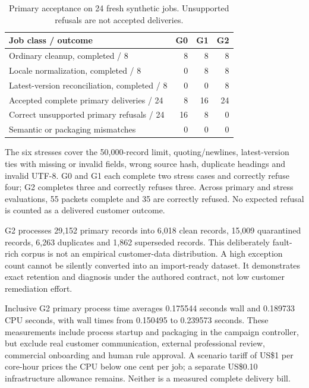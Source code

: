 \documentclass[11pt,letterpaper]{article}
\newcommand{\usd}[1]{US\$#1}
\begin{document}
\begin{table}[htbp]
\caption{Primary acceptance on 24 fresh synthetic jobs. Unsupported refusals are not accepted deliveries.}
\begin{tabularx}{\linewidth}{@{}Yrrr@{}}
\toprule
Job class / outcome & G0 & G1 & G2 \\
\midrule
Ordinary cleanup, completed / 8 & 8 & 8 & 8 \\
Locale normalization, completed / 8 & 0 & 8 & 8 \\
Latest-version reconciliation, completed / 8 & 0 & 0 & 8 \\
\midrule
Accepted complete primary deliveries / 24 & 8 & 16 & 24 \\
Correct unsupported primary refusals / 24 & 16 & 8 & 0 \\
Semantic or packaging mismatches & 0 & 0 & 0 \\
\bottomrule
\end{tabularx}
\label{tab:production}
\end{table}
The six stresses cover the 50,000-record limit, quoting/newlines, latest-version ties with missing or invalid fields, wrong source hash, duplicate headings and invalid UTF-8. G0 and G1 each complete two stress cases and correctly refuse four; G2 completes three and correctly refuses three. Across primary and stress evaluations, 55 packets complete and 35 are correctly refused. No expected refusal is counted as a delivered customer outcome.

G2 processes 29,152 primary records into 6,018 clean records, 15,009 quarantined records, 6,263 duplicates and 1,862 superseded records. This deliberately fault-rich corpus is not an empirical customer-data distribution. A high exception count cannot be silently converted into an import-ready dataset. It demonstrates exact retention and diagnosis under the authored contract, not low customer remediation effort.

Inclusive G2 primary process time averages 0.175544 seconds wall and 0.189733 CPU seconds, with wall times from 0.150495 to 0.239573 seconds. These measurements include process startup and packaging in the campaign controller, but exclude real customer communication, external professional review, commercial onboarding and human rule approval. A scenario tariff of \usd{1} per core-hour prices the CPU below one cent per job; a separate \usd{0.10} infrastructure allowance remains. Neither is a measured complete delivery bill.
\end{document}

